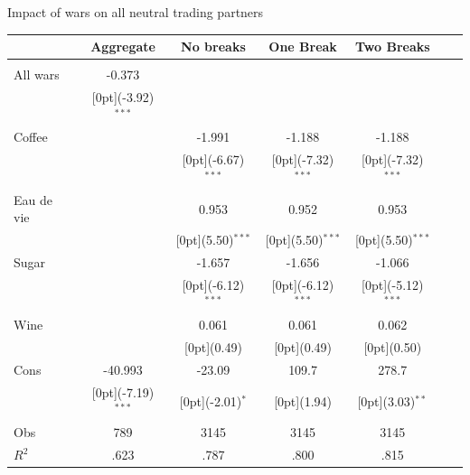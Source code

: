 \documentclass[11pt]{beamer}
\begin{document}
\begin{frame}{Impact of wars on all neutral trading partners }
\begin{tabular*}{\textwidth}{@{\extracolsep{\fill}}lcccccc}						
	& \multicolumn{1}{c}{Aggregate} &	\multicolumn{1}{c}{No breaks} &	\multicolumn{1}{c}{One Break} & \multicolumn{1}{c}{Two Breaks} & \\
\hline					
\hline \\		
All wars &	-0.373 &	 & & & & \\
&	\raisebox{.7ex}[0pt]{\scriptsize (-3.92)$^{***}$} 	& &	& &	& \\				
Coffee &	 & -1.991 & -1.188 &	-1.188  &\\
& &	\raisebox{.7ex}[0pt]{\scriptsize (-6.67)$^{***}$} &	\raisebox{.7ex}[0pt]{\scriptsize (-7.32)$^{***}$} &	\raisebox{.7ex}[0pt]{\scriptsize (-7.32)$^{***}$} &\\
Eau de vie  & &	0.953 &0.952 &	0.953  &\\
& &	\raisebox{.7ex}[0pt]{\scriptsize (5.50)$^{***}$} &	\raisebox{.7ex}[0pt]{\scriptsize (5.50)$^{***}$} &	\raisebox{.7ex}[0pt]{\scriptsize (5.50)$^{***}$} \\
Sugar	& &	-1.657 &-1.656 &	-1.066  \\
& &	\raisebox{.7ex}[0pt]{\scriptsize (-6.12)$^{***}$} &	\raisebox{.7ex}[0pt]{\scriptsize (-6.12)$^{***}$} &	\raisebox{.7ex}[0pt]{\scriptsize (-5.12)$^{***}$} \\
Wine&	 &	0.061 & 0.061 &	0.062 \\
& &	\raisebox{.7ex}[0pt]{\scriptsize (0.49)} &	\raisebox{.7ex}[0pt]{\scriptsize (0.49)} &	\raisebox{.7ex}[0pt]{\scriptsize (0.50)} \\
Cons &	-40.993 &	-23.09 &	109.7  &	278.7 \\
&	\raisebox{.7ex}[0pt]{\scriptsize (-7.19)$^{***}$} &	\raisebox{.7ex}[0pt]{\scriptsize (-2.01)$^{*}$} &	\raisebox{.7ex}[0pt]{\scriptsize (1.94)} &	\raisebox{.7ex}[0pt]{\scriptsize (3.03)$^{**}$} \\
\hline 
Obs &	789 &	3145 &	3145  & 3145 \\
$ R^2$ &	.623 &	.787 &	.800  & .815 \\

\hline\hline						
\end{tabular*}%
\end{frame}
\end{document}

